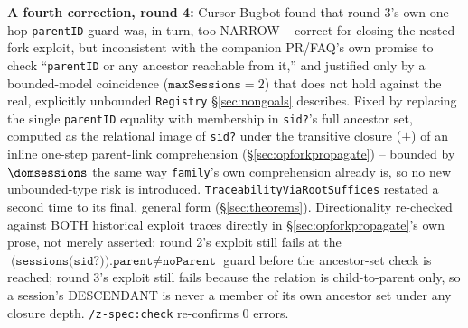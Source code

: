 \documentclass[a4paper,10pt,fleqn]{article}
\newcommand{\field}[1]{\texttt{#1}}
\begin{document}
\textbf{A fourth correction, round 4:} Cursor Bugbot found that round
3's own one-hop \field{parentID} guard was, in turn, too NARROW --
correct for closing the nested-fork exploit, but inconsistent with the
companion PR/FAQ's own promise to check ``\field{parentID} or any
ancestor reachable from it,'' and justified only by a bounded-model
coincidence ($\field{maxSessions} = 2$) that does not hold against the
real, explicitly unbounded \field{Registry} \S\ref{sec:nongoals}
describes. Fixed by replacing the single \field{parentID} equality with
membership in \field{sid?}'s full ancestor set, computed as the
relational image of \field{sid?} under the transitive closure
($\plus$) of an inline one-step parent-link comprehension
(\S\ref{sec:opforkpropagate}) -- bounded by $\dom \field{sessions}$ the
same way \field{family}'s own comprehension already is, so no new
unbounded-type risk is introduced. \field{TraceabilityViaRootSuffices}
restated a second time to its final, general form (\S\ref{sec:theorems}).
Directionality re-checked against BOTH historical exploit traces
directly in \S\ref{sec:opforkpropagate}'s own prose, not merely
asserted: round 2's exploit still fails at the
$\field{(sessions(sid?)).parent} \neq \field{noParent}$ guard before
the ancestor-set check is reached; round 3's exploit still fails
because the relation is child-to-parent only, so a session's
DESCENDANT is never a member of its own ancestor set under any closure
depth. \texttt{/z-spec:check} re-confirms 0 errors.
\end{document}
